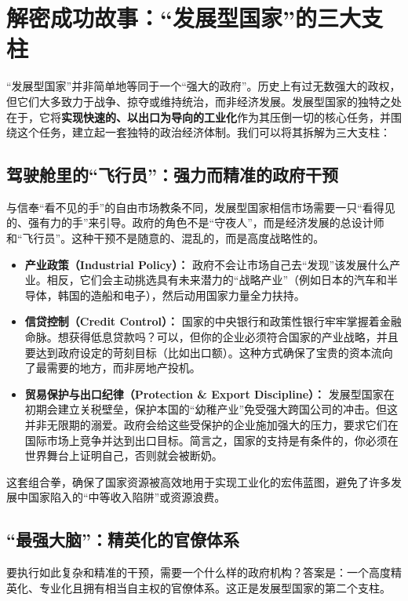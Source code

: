 \documentclass[a5paper, 11pt, openany]{ctexbook}
\begin{document}
\section{解密成功故事：“发展型国家”的三大支柱}

“发展型国家”并非简单地等同于一个“强大的政府”。历史上有过无数强大的政权，但它们大多致力于战争、掠夺或维持统治，而非经济发展。发展型国家的独特之处在于，它将\textbf{实现快速的、以出口为导向的工业化}作为其压倒一切的核心任务，并围绕这个任务，建立起一套独特的政治经济体制。我们可以将其拆解为三大支柱：

\subsection{驾驶舱里的“飞行员”：强力而精准的政府干预}

与信奉“看不见的手”的自由市场教条不同，发展型国家相信市场需要一只“看得见的、强有力的手”来引导。政府的角色不是“守夜人”，而是经济发展的总设计师和“飞行员”。这种干预不是随意的、混乱的，而是高度战略性的。
\begin{itemize}
    \item \textbf{产业政策（Industrial Policy）：} 政府不会让市场自己去“发现”该发展什么产业。相反，它们会主动挑选具有未来潜力的“战略产业”（例如日本的汽车和半导体，韩国的造船和电子），然后动用国家力量全力扶持。
    \item \textbf{信贷控制（Credit Control）：} 国家的中央银行和政策性银行牢牢掌握着金融命脉。想获得低息贷款吗？可以，但你的企业必须符合国家的产业战略，并且要达到政府设定的苛刻目标（比如出口额）。这种方式确保了宝贵的资本流向了最需要的地方，而非房地产投机。
    \item \textbf{贸易保护与出口纪律（Protection \& Export Discipline）：} 发展型国家在初期会建立关税壁垒，保护本国的“幼稚产业”免受强大跨国公司的冲击。但这并非无限期的溺爱。政府会给这些受保护的企业施加强大的压力，要求它们在国际市场上竞争并达到出口目标。简言之，国家的支持是有条件的，你必须在世界舞台上证明自己，否则就会被断奶。
\end{itemize}
这套组合拳，确保了国家资源被高效地用于实现工业化的宏伟蓝图，避免了许多发展中国家陷入的“中等收入陷阱”或资源浪费。

\subsection{“最强大脑”：精英化的官僚体系}

要执行如此复杂和精准的干预，需要一个什么样的政府机构？答案是：一个高度精英化、专业化且拥有相当自主权的官僚体系。这正是发展型国家的第二个支柱。
\end{document}

